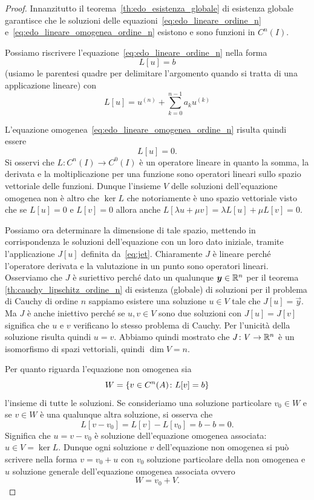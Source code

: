 \begin{proof}
\mymark{***}
Innanzitutto il teorema~\ref{th:edo_esistenza_globale} di esistenza globale garantisce che
le soluzioni delle equazioni~\eqref{eq:edo_lineare_ordine_n}
e~\eqref{eq:edo_lineare_omogenea_ordine_n} esistono e sono funzioni in $C^n(I)$.

Possiamo riscrivere l'equazione~\eqref{eq:edo_lineare_ordine_n} nella forma
\[
  L[u] = b
\]
(usiamo le parentesi quadre per delimitare l'argomento quando si tratta di una 
applicazione lineare)
con
\[
  L[u] = u^{(n)} + \sum_{k=0}^{n-1} a_k u^{(k)}
\]

L'equazione omogenea~\eqref{eq:edo_lineare_omogenea_ordine_n}
risulta quindi essere
\[
  L[u] = 0.
\]
Si osservi che $L\colon C^n(I) \to C^0(I)$ è un operatore lineare in quanto la
somma, la derivata e la moltiplicazione per una funzione sono operatori lineari
sullo spazio vettoriale delle funzioni.
Dunque l'insieme $V$ delle soluzioni dell'equazione omogenea non è altro che
$\ker L$ che notoriamente è uno spazio vettoriale visto che se $L[u]=0$ e $L[v]=0$
allora anche $L[\lambda u + \mu v] = \lambda L[u] + \mu L[v] = 0$.

Possiamo ora determinare la dimensione di tale spazio, mettendo in
corrispondenza le soluzioni dell'equazione con un loro dato iniziale,
tramite l'applicazione $J[u]$ definita da~\eqref{eq:jet}.
Chiaramente $J$ è lineare perché l'operatore derivata e la valutazione in un
punto sono operatori lineari. Osserviamo che $J$ è suriettivo perché dato un
qualunque $\boldsymbol y\in {\mathbb R}^n$ per il teorema \ref{th:cauchy_lipschitz_ordine_n}
di esistenza (globale) di soluzioni per il problema di Cauchy di ordine $n$
sappiamo esistere una soluzione $u\in V$ tale che $J[u]=\vec y$. Ma $J$ è anche
iniettivo perché se $u,v\in V$ sono due soluzioni con $J[u]=J[v]$ significa
che $u$ e $v$ verificano lo stesso problema di Cauchy.
Per l'unicità della soluzione risulta quindi $u=v$.
Abbiamo quindi mostrato che $J\colon V \to {\mathbb R}^n$ è un isomorfismo di spazi
 vettoriali, quindi $\dim V=n$.

Per quanto riguarda l'equazione non omogenea
sia
\[
W = {\left\{ v\in C^n(A)\colon L[v] = b \right\}}
\]
l'insieme di tutte le soluzioni.
Se consideriamo una soluzione particolare $v_0\in W$ e se $v\in W$ è una
qualunque altra soluzione, si osserva che
\[
  L[v-v_0] = L[v] - L[v_0] = b-b = 0.
\]
Significa che $u=v-v_0$ è soluzione dell'equazione omogenea associata:
$u\in V=\ker L$.
Dunque ogni soluzione $v$ dell'equazione non omogenea si può scrivere nella
forma $v = v_0 + u$ con $v_0$ soluzione particolare della non omogenea e
$u$ soluzione generale dell'equazione omogenea associata ovvero
\[
  W = v_0 + V.
\]
\end{proof}

